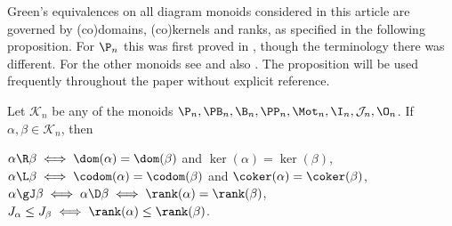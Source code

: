 Green's equivalences on all diagram monoids considered in this article are
governed by (co)domains, (co)kernels and ranks, as specified in the following
proposition.  For $\P_n$ this  was first proved in \cite{Wilcox2007}, though
the terminology there was different.  For the other monoids see \cite[Theorem
2.4]{DEG2017} and also \cite{Fernandes2001,FL2011,GMbook,Wilcox2007}.  The
proposition will be used frequently throughout the paper without explicit
reference.


\begin{proposition}\label{prop:green_all_inclusive}
Let $\mathcal{K}_n$ be any of the monoids $\P_n,\PB_n,\B_n,\PP_n,\Mot_n,\I_n,\mathcal J_n,\O_n$.  If $\alpha,\beta\in\mathcal K_n$, then
  \begin{itemize}
 $\alpha\R\beta\iff\dom(\alpha)=\dom(\beta)$ and $\ker(\alpha)=\ker(\beta)$,
 $\alpha\L\beta\iff\codom(\alpha)=\codom(\beta)$ and $\coker(\alpha)=\coker(\beta)$,
 $\alpha\gJ\beta\iff\alpha\D\beta\iff\rank(\alpha)=\rank(\beta)$,
 $J_\alpha\leq J_\beta\iff\rank(\alpha)\leq\rank(\beta)$.
\epfres
\end{itemize}
\end{proposition}




